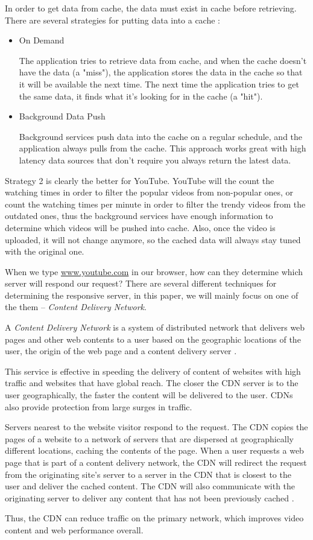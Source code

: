 In order to get data from cache, the data must exist in cache before retrieving. There are several strategies for putting data into a cache \cite{azure:distributed}:
\begin{itemize}
	\item On Demand 

	The application tries to retrieve data from cache, and when the cache doesn't have the data (a "miss"), the application stores the data in the cache so that it will be available the next time. The next time the application tries to get the same data, it finds what it's looking for in the cache (a "hit").
	
	\item Background Data Push
	
	Background services push data into the cache on a regular schedule, and the application always pulls from the cache. This approach works great with high latency data sources that don't require you always return the latest data.
\end{itemize}

Strategy 2 is clearly the better for YouTube. YouTube will the count the watching times in order to filter the popular videos from non-popular ones, or count the watching times per minute in order to filter the trendy videos from the outdated ones, thus the background services have enough information to determine which videos will be pushed into cache. Also, once the video is uploaded, it will not change anymore, so the cached data will always stay tuned with the original one.

When we type \url{www.youtube.com} in our browser, how can they determine which server will respond our request? There are several different techniques for determining the responsive server, in this paper, we will mainly focus on one of the them -- \textit{Content Delivery Network}.

A \textit{Content Delivery Network} is a system of distributed network that delivers web pages and other web contents to a user based on the geographic locations of the user, the origin of the web page and a content delivery server \cite{webopedia:cdn}.

This service is effective in speeding the delivery of content of websites with high traffic and websites that have global reach. The closer the CDN server is to the user geographically, the faster the content will be delivered to the user. CDNs also provide protection from large surges in traffic.

Servers nearest to the website visitor respond to the request. The CDN copies the pages of a website to a network of servers that are dispersed at geographically different locations, caching the contents of the page. When a user requests a web page that is part of a content delivery network, the CDN will redirect the request from the originating site's server to a server in the CDN that is closest to the user and deliver the cached content. The CDN will also communicate with the originating server to deliver any content that has not been previously cached .

Thus, the CDN can reduce traffic on the primary network, which improves video content and web performance overall.
